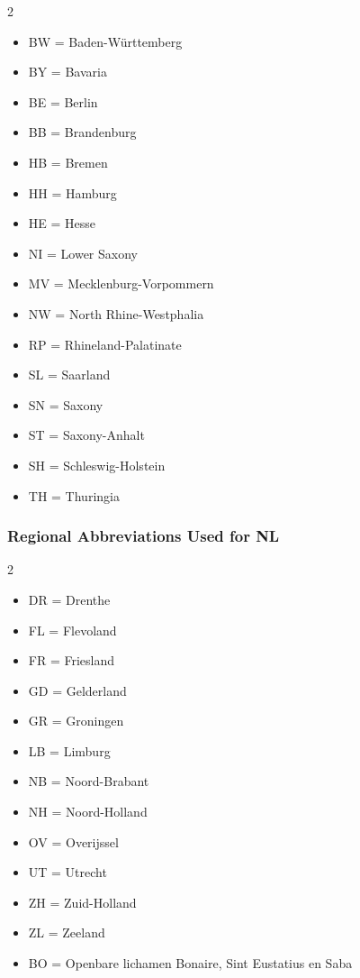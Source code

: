 \documentclass{article}
\begin{document}
\begin{multicols}{2}
\begin{itemize}
\item BW	=	Baden-Württemberg	
\item BY	=	Bavaria	
\item BE	=	Berlin	
\item BB	=	Brandenburg	
\item HB	=	Bremen	
\item HH	=	Hamburg	
\item HE	=	Hesse	
\item NI	=	Lower Saxony	
\item MV	=	Mecklenburg-Vorpommern	
\item NW	=	North Rhine-Westphalia	
\item RP	=	Rhineland-Palatinate	
\item SL	=	Saarland	
\item SN	=	Saxony	
\item ST	=	Saxony-Anhalt	
\item SH	=	Schleswig-Holstein	
\item TH  	=	Thuringia	
\end{itemize}
\end{multicols}


\subsubsection{Regional Abbreviations Used for NL}
\begin{multicols}{2}
\begin{itemize}
    \item DR = Drenthe
    \item FL = Flevoland
    \item FR = Friesland
    \item GD = Gelderland
    \item GR = Groningen
    \item LB = Limburg
    \item NB = Noord-Brabant
    \item NH = Noord-Holland
    \item OV = Overijssel
    \item UT = Utrecht
    \item ZH = Zuid-Holland
    \item ZL = Zeeland
    \item BO = Openbare lichamen Bonaire, Sint Eustatius en Saba
\end{itemize}
\end{multicols}
\end{document}
